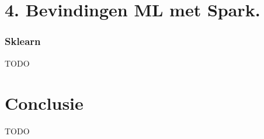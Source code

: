 \documentclass[a4paper,12pt,twoside]{report}
\begin{document}
\chapter*{4. Bevindingen ML met Spark.}

\subsection*{Sklearn}

TODO

\chapter*{Conclusie}

TODO

\appendix
\end{document}
